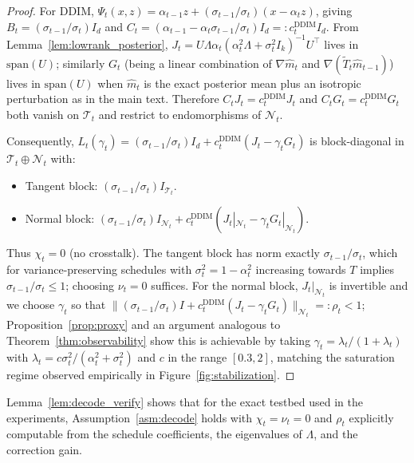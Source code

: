 \documentclass{article}
\theoremstyle{plain}
\theoremstyle{definition}
\theoremstyle{remark}
\begin{document}
\begin{proof}
For DDIM, \(\Psi_t(x,z) = \alpha_{t-1}z + (\sigma_{t-1}/\sigma_t)(x -
\alpha_t z)\), giving \(B_t = (\sigma_{t-1}/\sigma_t)I_d\) and
\(C_t = (\alpha_{t-1} - \alpha_t\sigma_{t-1}/\sigma_t)I_d =:
c_t^{\mathrm{DDIM}} I_d\). From Lemma~\ref{lem:lowrank_posterior},
\(J_t = U\Lambda\alpha_t(\alpha_t^2\Lambda + \sigma_t^2 I_k)^{-1} U^\top\)
lives in \(\mathrm{span}(U)\); similarly \(G_t\) (being a linear combination
of \(\nabla \hat m_t\) and \(\nabla(\tilde T_t\hat m_{t-1})\)) lives in
\(\mathrm{span}(U)\) when \(\hat m_t\) is the exact posterior mean plus an
isotropic perturbation as in the main text. Therefore
\(C_t J_t = c_t^{\mathrm{DDIM}} J_t\) and
\(C_t G_t = c_t^{\mathrm{DDIM}} G_t\) both vanish on \(\mathcal{T}_t\) and
restrict to endomorphisms of \(\mathcal{N}_t\).

Consequently, \(L_t(\gamma_t) = (\sigma_{t-1}/\sigma_t)I_d + c_t^{\mathrm{DDIM}}
(J_t - \gamma_t G_t)\) is block-diagonal in
\(\mathcal{T}_t\oplus\mathcal{N}_t\) with:
\begin{itemize}[leftmargin=1.2em]
  \item Tangent block: \((\sigma_{t-1}/\sigma_t) I_{\mathcal{T}_t}\).
  \item Normal block: \((\sigma_{t-1}/\sigma_t)I_{\mathcal{N}_t}
    + c_t^{\mathrm{DDIM}}(J_t|_{\mathcal{N}_t} - \gamma_t G_t|_{\mathcal{N}_t})\).
\end{itemize}
Thus \(\chi_t = 0\) (no crosstalk). The tangent block has norm exactly
\(\sigma_{t-1}/\sigma_t\), which for variance-preserving schedules with
\(\sigma_t^2 = 1-\alpha_t^2\) increasing towards \(T\) implies
\(\sigma_{t-1}/\sigma_t \le 1\); choosing \(\nu_t = 0\) suffices. For the
normal block, \(J_t|_{\mathcal{N}_t}\) is invertible and we choose
\(\gamma_t\) so that \(\|(\sigma_{t-1}/\sigma_t)I + c_t^{\mathrm{DDIM}}(J_t
- \gamma_t G_t)\|_{\mathcal{N}_t} =: \rho_t < 1\); Proposition~\ref{prop:proxy}
and an argument analogous to Theorem~\ref{thm:observability} show this is
achievable by taking \(\gamma_t = \lambda_t/(1+\lambda_t)\) with \(\lambda_t
= c\sigma_t^2/(\alpha_t^2+\sigma_t^2)\) and \(c\) in the range
\([0.3, 2]\), matching the saturation regime observed empirically in
Figure~\ref{fig:stabilization}.
\end{proof}

Lemma~\ref{lem:decode_verify} shows that for the exact testbed used in the
experiments, Assumption~\ref{asm:decode} holds with \(\chi_t = \nu_t = 0\)
and \(\rho_t\) explicitly computable from the schedule coefficients, the
eigenvalues of \(\Lambda\), and the correction gain.
\end{document}
